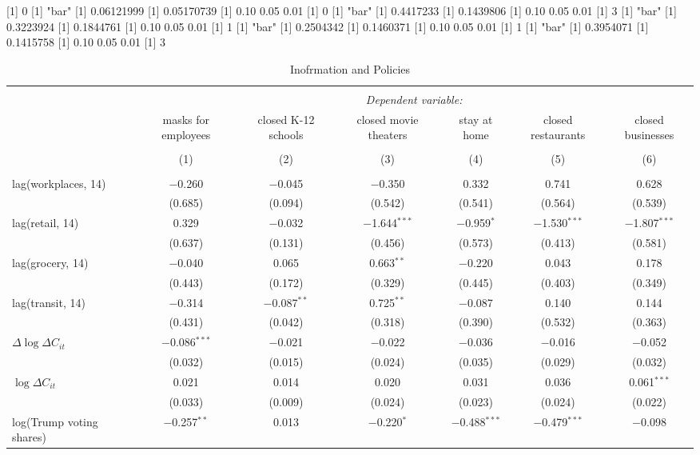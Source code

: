 [1] 0
[1] "bar"
[1] 0.06121999
[1] 0.05170739
[1] 0.10 0.05 0.01
[1] 0
[1] "bar"
[1] 0.4417233
[1] 0.1439806
[1] 0.10 0.05 0.01
[1] 3
[1] "bar"
[1] 0.3223924
[1] 0.1844761
[1] 0.10 0.05 0.01
[1] 1
[1] "bar"
[1] 0.2504342
[1] 0.1460371
[1] 0.10 0.05 0.01
[1] 1
[1] "bar"
[1] 0.3954071
[1] 0.1415758
[1] 0.10 0.05 0.01
[1] 3

\begin{table}[!htbp] \centering 
  \caption{Inofrmation and Policies} 
  \label{} 
\begin{tabular}{@{\extracolsep{1pt}}lcccccc} 
\\[-1.8ex]\hline 
\hline \\[-1.8ex] 
 & \multicolumn{6}{c}{\textit{Dependent variable:}} \\ 
\cline{2-7} 
 & masks for employees & closed K-12 schools & closed movie theaters & stay at home & closed restaurants & closed businesses \\ 
\\[-1.8ex] & (1) & (2) & (3) & (4) & (5) & (6)\\ 
\hline \\[-1.8ex] 
 lag(workplaces, 14) & $-$0.260 & $-$0.045 & $-$0.350 & 0.332 & 0.741 & 0.628 \\ 
  & (0.685) & (0.094) & (0.542) & (0.541) & (0.564) & (0.539) \\ 
  lag(retail, 14) & 0.329 & $-$0.032 & $-$1.644$^{***}$ & $-$0.959$^{*}$ & $-$1.530$^{***}$ & $-$1.807$^{***}$ \\ 
  & (0.637) & (0.131) & (0.456) & (0.573) & (0.413) & (0.581) \\ 
  lag(grocery, 14) & $-$0.040 & 0.065 & 0.663$^{**}$ & $-$0.220 & 0.043 & 0.178 \\ 
  & (0.443) & (0.172) & (0.329) & (0.445) & (0.403) & (0.349) \\ 
  lag(transit, 14) & $-$0.314 & $-$0.087$^{**}$ & 0.725$^{**}$ & $-$0.087 & 0.140 & 0.144 \\ 
  & (0.431) & (0.042) & (0.318) & (0.390) & (0.532) & (0.363) \\ 
  $\Delta \log \Delta C_{it}$ & $-$0.086$^{***}$ & $-$0.021 & $-$0.022 & $-$0.036 & $-$0.016 & $-$0.052 \\ 
  & (0.032) & (0.015) & (0.024) & (0.035) & (0.029) & (0.032) \\ 
  $\log \Delta C_{it}$ & 0.021 & 0.014 & 0.020 & 0.031 & 0.036 & 0.061$^{***}$ \\ 
  & (0.033) & (0.009) & (0.024) & (0.023) & (0.024) & (0.022) \\ 
  log(Trump voting shares) & $-$0.257$^{**}$ & 0.013 & $-$0.220$^{*}$ & $-$0.488$^{***}$ & $-$0.479$^{***}$ & $-$0.098 \\ 

\end{tabular}
\end{table}
